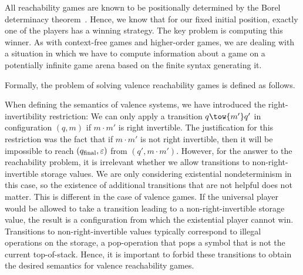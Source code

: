 \documentclass[../../diss.tex]{subfiles}
\begin{document}
All reachability games are known to be positionally determined by the Borel determinacy theorem~\cite{Martin75}.
Hence, we know that for our fixed initial position, exactly one of the players has a winning strategy.
The key problem is computing this winner.
As with context-free games and higher-order games, we are dealing with a situation in which we have to compute information about a game on a potentially infinite game arena based on the finite syntax generating it.

Formally, the problem of solving valence reachability games is defined as follows.

\begin{problem}
\end{problem}

\begin{remark*}
    When defining the semantics of valence systems, we have introduced the right-invertibility restriction: We can only apply a transition $q \tow{m'} q'$ in configuration $(q,m)$ if $m \cdot m'$ is right invertible.
    The justification for this restriction was the fact that if $m \cdot m'$ is not right invertible, then it will be impossible to reach $(q_{\text{final}},\varepsilon)$ from $(q',m \cdot m')$.
    However, for the answer to the reachability problem, it is irrelevant whether we allow transitions to non-right-invertible storage values.
    We are only considering existential nondeterminism in this case, so the existence of additional transitions that are not helpful does not matter.
    This is different in the case of valence games.
    If the universal player would be allowed to take a transition leading to a non-right-invertible storage value, the result is a configuration from which the existential player cannot win.
    Transitions to non-right-invertible values typically correspond to illegal operations on the storage, \eg a pop-operation that pops a symbol that is not the current top-of-stack.
    Hence, it is important to forbid these transitions to obtain the desired semantics for valence reachability games.
\end{remark*}
\end{document}
